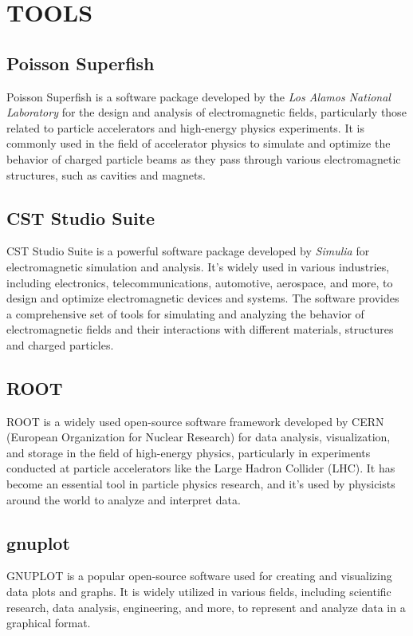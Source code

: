 \documentclass[a4paper,oneside,12pt]{report}
\numberwithin{equation}{chapter}
\begin{document}
\newpage


\chapter{TOOLS}

\section{Poisson Superfish}
Poisson Superfish is a software package developed by the \textit{Los Alamos National Laboratory} 
for the design and analysis of electromagnetic fields, particularly those related to particle accelerators and high-energy physics experiments.
It is commonly used in the field of accelerator physics to simulate and optimize the behavior of charged particle beams as they pass through various electromagnetic structures, such as cavities and magnets.


\section{CST Studio Suite}
CST Studio Suite is a powerful software package developed by \textit{Simulia} for electromagnetic simulation and analysis. It's widely used in various industries, including electronics, telecommunications, automotive, aerospace, and more, to design and optimize electromagnetic devices and systems. 
The software provides a comprehensive set of tools for simulating and analyzing the behavior of electromagnetic fields and their interactions with different materials, structures and charged particles.

\section{ROOT}
ROOT is a widely used open-source software framework developed by CERN (European Organization for Nuclear Research) for data analysis,
visualization, and storage in the field of high-energy physics, particularly in experiments conducted at particle accelerators 
like the Large Hadron Collider (LHC). It has become an essential tool in particle physics research, 
and it's used by physicists around the world to analyze and interpret data.

\section{gnuplot}
GNUPLOT is a popular open-source software used for creating and visualizing data plots and graphs. 
It is widely utilized in various fields, including scientific research, data analysis, engineering, and more, 
to represent and analyze data in a graphical format. 
\end{document}
